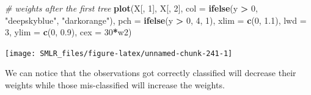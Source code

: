 \documentclass[
]{book}
\newenvironment{Shaded}{\begin{snugshade}}{\end{snugshade}}
\newcommand{\AttributeTok}[1]{\textcolor[rgb]{0.13,0.29,0.53}{#1}}
\newcommand{\CommentTok}[1]{\textcolor[rgb]{0.56,0.35,0.01}{\textit{#1}}}
\newcommand{\DecValTok}[1]{\textcolor[rgb]{0.00,0.00,0.81}{#1}}
\newcommand{\FloatTok}[1]{\textcolor[rgb]{0.00,0.00,0.81}{#1}}
\newcommand{\FunctionTok}[1]{\textcolor[rgb]{0.13,0.29,0.53}{\textbf{#1}}}
\newcommand{\NormalTok}[1]{#1}
\newcommand{\SpecialCharTok}[1]{\textcolor[rgb]{0.81,0.36,0.00}{\textbf{#1}}}
\newcommand{\StringTok}[1]{\textcolor[rgb]{0.31,0.60,0.02}{#1}}
\theoremstyle{definition}
\theoremstyle{definition}
\theoremstyle{definition}
\theoremstyle{definition}
\theoremstyle{remark}
\begin{document}
\begin{Shaded}
\begin{Highlighting}[]
  \CommentTok{\# weights after the first tree}
  \FunctionTok{plot}\NormalTok{(X[, }\DecValTok{1}\NormalTok{], X[, }\DecValTok{2}\NormalTok{], }\AttributeTok{col =} \FunctionTok{ifelse}\NormalTok{(y }\SpecialCharTok{\textgreater{}} \DecValTok{0}\NormalTok{, }\StringTok{"deepskyblue"}\NormalTok{, }\StringTok{"darkorange"}\NormalTok{),}
       \AttributeTok{pch =} \FunctionTok{ifelse}\NormalTok{(y }\SpecialCharTok{\textgreater{}} \DecValTok{0}\NormalTok{, }\DecValTok{4}\NormalTok{, }\DecValTok{1}\NormalTok{), }\AttributeTok{xlim =} \FunctionTok{c}\NormalTok{(}\DecValTok{0}\NormalTok{, }\FloatTok{1.1}\NormalTok{), }\AttributeTok{lwd =} \DecValTok{3}\NormalTok{,}
       \AttributeTok{ylim =} \FunctionTok{c}\NormalTok{(}\DecValTok{0}\NormalTok{, }\FloatTok{0.9}\NormalTok{), }\AttributeTok{cex =} \DecValTok{30}\SpecialCharTok{*}\NormalTok{w2)}
\end{Highlighting}
\end{Shaded}

\begin{center}\texttt{[image: SMLR\_files/figure-latex/unnamed-chunk-241-1]} \end{center}

We can notice that the observations got correctly classified will decrease their weights while those mis-classified will increase the weights.
\end{document}
